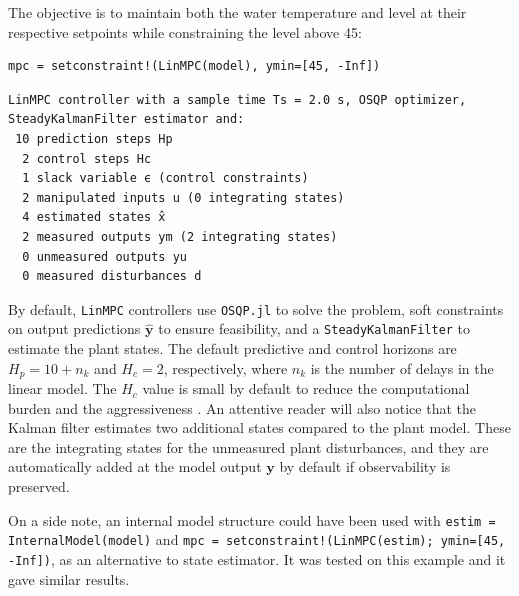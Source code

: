 The objective is to maintain both the water temperature and level at their respective setpoints while constraining the level above 45:
\begin{verbatim}
mpc = setconstraint!(LinMPC(model), ymin=[45, -Inf])
\end{verbatim}
\spacerepl
\begin{verbatim}
LinMPC controller with a sample time Ts = 2.0 s, OSQP optimizer, 
SteadyKalmanFilter estimator and:
 10 prediction steps Hp
  2 control steps Hc
  1 slack variable ϵ (control constraints)
  2 manipulated inputs u (0 integrating states)
  4 estimated states x̂
  2 measured outputs ym (2 integrating states)
  0 unmeasured outputs yu
  0 measured disturbances d
\end{verbatim}
By default, \texttt{LinMPC} controllers use \texttt{OSQP.jl} \citep{osqp} to solve the problem, soft constraints on output predictions $\mathbf{\hat y}$ to ensure feasibility, and a \texttt{SteadyKalmanFilter} to estimate the plant states. The default predictive and control horizons are $H_p = 10 + n_k$ and $H_c = 2$, respectively, where $n_k$ is the number of delays in the linear model. The $H_c$ value is small by default to reduce the computational burden and the aggressiveness \citep{mpcHcAnalysis}. An attentive reader will also notice that the Kalman filter estimates two additional states compared to the plant model. These are the integrating states for the unmeasured plant disturbances, and they are automatically added at the model output $\mathbf{y}$ by default if observability is preserved.

On a side note, an internal model structure could have been used with \texttt{estim = InternalModel(model)} and \texttt{mpc = setconstraint!(LinMPC(estim); ymin=[45, -Inf])}, as an alternative to state estimator. It was tested on this example and it gave similar results.

